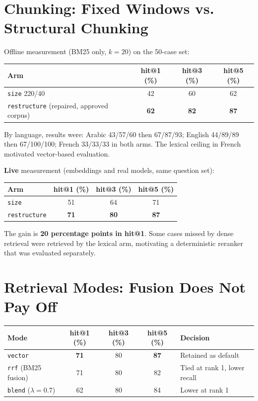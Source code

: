 \documentclass[a4paper,12pt,openany]{report}
\begin{document}
\section{Chunking: Fixed Windows vs. Structural Chunking}
Offline measurement (BM25 only, $k=20$) on the 50-case set:

\begin{table}[htbp]
\centering
\begin{tabular}{lccc}
\toprule
\textbf{Arm} & \textbf{hit@1 (\%)} & \textbf{hit@3 (\%)} & \textbf{hit@5 (\%)} \\
\midrule
\texttt{size} 220/40 & 42 & 60 & 62 \\
\texttt{restructure} (repaired, approved corpus) & \textbf{62} & \textbf{82} & \textbf{87} \\
\bottomrule
\end{tabular}
\end{table}

By language, results were: Arabic 43/57/60 then 67/87/93; English 44/89/89 then 67/100/100;
French 33/33/33 in both arms. The lexical ceiling in French motivated vector-based evaluation.

\textbf{Live} measurement (embeddings and real models, same question set):
\begin{table}[htbp]
\centering
\begin{tabular}{lccc}
\toprule
\textbf{Arm} & \textbf{hit@1 (\%)} & \textbf{hit@3 (\%)} & \textbf{hit@5 (\%)} \\
\midrule
\texttt{size} & 51 & 64 & 71 \\
\texttt{restructure} & \textbf{71} & \textbf{80} & \textbf{87} \\
\bottomrule
\end{tabular}
\end{table}

The gain is \textbf{20 percentage points in hit@1}. Some cases missed by dense retrieval were
retrieved by the lexical arm, motivating a deterministic reranker that was evaluated separately.

\section{Retrieval Modes: Fusion Does Not Pay Off}
\begin{table}[htbp]
\centering
\small
\begin{tabular}{lcccl}
\toprule
\textbf{Mode} & \textbf{hit@1 (\%)} & \textbf{hit@3 (\%)} & \textbf{hit@5 (\%)} &
\textbf{Decision} \\
\midrule
\texttt{vector} & \textbf{71} & 80 & \textbf{87} & Retained as default \\
\texttt{rrf} (BM25 fusion) & 71 & 80 & 82 & Tied at rank 1, lower recall \\
\texttt{blend} ($\lambda=0.7$) & 62 & 80 & 84 & Lower at rank 1 \\
\bottomrule
\end{tabular}
\end{table}
\end{document}
